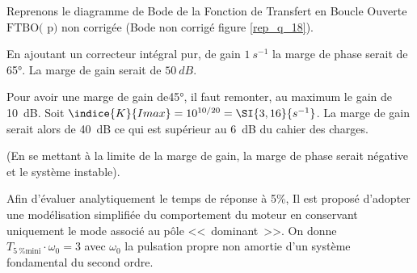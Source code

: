 Reprenons le diagramme de Bode de la Fonction de Transfert en Boucle Ouverte $\text{FTBO( p)}$ non corrigée (Bode non corrigé figure \ref{rep_q_18}).

\ifprof
\begin{corrige}
En ajoutant un correcteur intégral pur, de gain $\SI{1}{s^{-1}}$ la marge de phase serait de \ang{65}. La marge de gain serait de $\SI{50}{dB}$. 

Pour avoir une marge de gain de\ang{45}, il faut remonter, au maximum le gain de \SI{10}{dB}. Soit $\indice{K}{I max} = 10^{10/20}=\SI{3,16}{s^{-1}}$. La marge de gain serait alors de \SI{40}{dB} ce qui est supérieur au \SI{6}{dB} du cahier des charges. 

(En se mettant à la limite de la marge de gain, la marge de phase serait négative et le système instable).
\end{corrige}
\else
\fi

\ifprof
\else
Afin d'évaluer analytiquement le temps de réponse à 5\%, Il est proposé d'adopter une modélisation simplifiée du
comportement du moteur en conservant uniquement le mode associé au pôle <<~dominant~>>. On donne $T_{\SI{5}{\%} \text{mini}}\cdot \omega_0 = 3$ avec $\omega_0$ la pulsation propre non amortie d'un système fondamental du second ordre.
\fi


